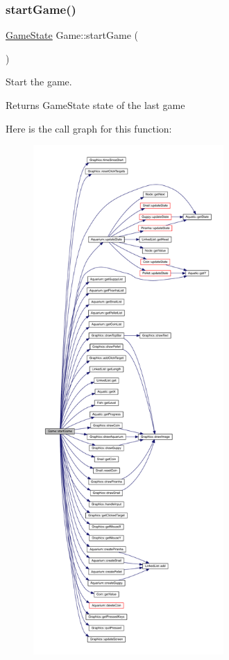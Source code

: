 \subsubsection{\texorpdfstring{start\+Game()}{startGame()}}
{\footnotesize\ttfamily \mbox{\hyperlink{_constants_8hpp_a7899b65f1ea0f655e4bbf8d2a5714285}{Game\+State}} Game\+::start\+Game (\begin{DoxyParamCaption}{ }\end{DoxyParamCaption})}



Start the game. 

\begin{DoxyReturn}{Returns}
Game\+State state of the last game 
\end{DoxyReturn}
Here is the call graph for this function\+:\nopagebreak
\begin{figure}[H]
\begin{center}
\leavevmode
\includegraphics[height=550pt]{class_game_afcca871ec55fbe14b2179bcb914d5421_cgraph}
\end{center}
\end{figure}

